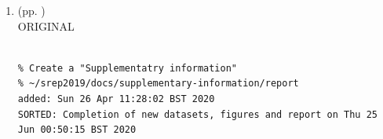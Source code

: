 \documentclass[10pt]{article}
\begin{document}
\begin{enumerate}
\begin{verbatim}
%%\subsection*{Other effects on 3D RQA ENTR values}
%Zbilut et al. \cite{zbilut1992} established RQA metrics with the aim of 
%determining embedding parameters, their method consisted on creating 3D 
%surfaces with RQA metrics with an increase of embedding parameters 
%($m$ and $\tau$), then Zbilut et al. \cite{zbilut1992} explored 
%fluctuations and gradual changes in the 3D surfaces that provide information 
%about the embeddings. Much recently, Marwan et al. \cite{marwan2015} 
%created 3D surfaces for visual selection of not only embedding parameters 
%but also recurrence thresholds. Following same methodologies, we explored 
%the stability and robustness of RQA metrics (REC, DET, RATIO and ENTR)
%using 3D surfaces by an unitary increase of the pair embedding 
%parameters ($0 \ge m \le 10$, $0 \ge \tau \le 10$) and a decimal increase 
%of 0.1 for recurrence thresholds ($ 0.2 \ge \epsilon \le 3 $) 
%(Fig.~\ref{fig:topo_rqas}). 
Similarly, Figs~\ref{fig:3dRQAENTR_sensoractivities} show 3D surfaces of 
ENTR values for different sensors and different activities. 
Maximum values of ENTR (lateral bars) in Figs~\ref{fig:3dRQAENTR_sensoractivities} 
decrease for activities from normal (HN, VN) to faster (HF, VF) velocity and 
from human sensor (HS01) to robot sensor (RS01).


	{\bf 3D surfaces of RQA ENTR metrics for sensors and activities.}
	RQA ENTR values with embedding parameters
	$ \{ m \in \mathbb{R} | 0 \le m \le 10  \}$,
	$ \{ \tau \in \mathbb{R} | 0 \le \tau \le 10  \}$
	with $\epsilon = 1 $ for different activities and sensors. 
	RQA ENTR values are for $p03$, sg0 and window size of 10-secs (500 samples).
	Code and data to reproduce the figure is available in \cite{srep2020}.
 
\end{verbatim}

\textit{
LOG: \\ 
Tue 14 Apr 11:55:28 BST 2020
}
\\




\item  (pp. ) \\
ORIGINAL
\begin{verbatim}

% Create a "Supplementatry information"
% ~/srep2019/docs/supplementary-information/report
added: Sun 26 Apr 11:28:02 BST 2020
SORTED: Completion of new datasets, figures and report on Thu 25 Jun 00:50:15 BST 2020



\end{verbatim}
\end{enumerate}
\end{document}
